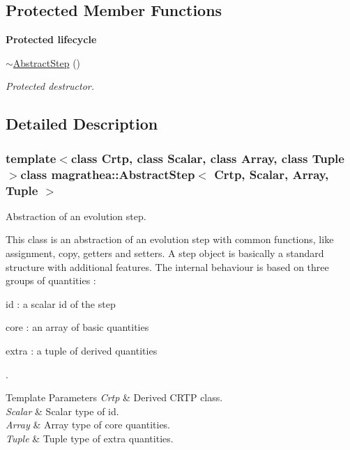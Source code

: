 \subsection*{Protected Member Functions}
\begin{Indent}{\bf Protected lifecycle}\par
\begin{DoxyCompactItemize}
\item 
\hyperlink{classmagrathea_1_1AbstractStep_af7c09cc4b31e6a751bb59b9127f40c41}{$\sim$\-Abstract\-Step} ()
\begin{DoxyCompactList}\small\item\em Protected destructor. \end{DoxyCompactList}\end{DoxyCompactItemize}
\end{Indent}


\subsection{Detailed Description}
\subsubsection*{template$<$class Crtp, class Scalar, class Array, class Tuple$>$class magrathea\-::\-Abstract\-Step$<$ Crtp, Scalar, Array, Tuple $>$}

Abstraction of an evolution step. 

This class is an abstraction of an evolution step with common functions, like assignment, copy, getters and setters. A step object is basically a standard structure with additional features. The internal behaviour is based on three groups of quantities \-: 
\begin{DoxyItemize}
\item id \-: a scalar id of the step 
\item core \-: an array of basic quantities 
\item extra \-: a tuple of derived quantities
\end{DoxyItemize}. 
\begin{DoxyTemplParams}{Template Parameters}
{\em Crtp} & Derived C\-R\-T\-P class. \\
\hline
{\em Scalar} & Scalar type of id. \\
\hline
{\em Array} & Array type of core quantities. \\
\hline
{\em Tuple} & Tuple type of extra quantities. \\
\hline
\end{DoxyTemplParams}


